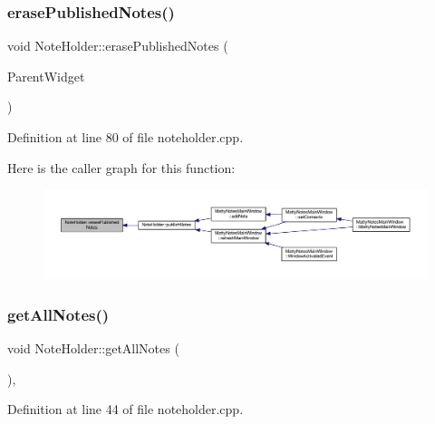 \subsubsection{\texorpdfstring{erase\+Published\+Notes()}{erasePublishedNotes()}}
{\footnotesize\ttfamily void Note\+Holder\+::erase\+Published\+Notes (\begin{DoxyParamCaption}\item[{Q\+Widget $\ast$}]{Parent\+Widget }\end{DoxyParamCaption})\hspace{0.3cm}{\ttfamily [static]}}



Definition at line 80 of file noteholder.\+cpp.

Here is the caller graph for this function\+:
\nopagebreak
\begin{figure}[H]
\begin{center}
\leavevmode
\includegraphics[width=350pt]{classNoteHolder_a4559ef4141f902ae5712052084c6187e_icgraph}
\end{center}
\end{figure}
\hypertarget{classNoteHolder_a53853f7b183e262eb165bdb3af8f3e45}{}\label{classNoteHolder_a53853f7b183e262eb165bdb3af8f3e45} 
\subsubsection{\texorpdfstring{get\+All\+Notes()}{getAllNotes()}}
{\footnotesize\ttfamily void Note\+Holder\+::get\+All\+Notes (\begin{DoxyParamCaption}{ }\end{DoxyParamCaption})\hspace{0.3cm}{\ttfamily [static]}, {\ttfamily [private]}}



Definition at line 44 of file noteholder.\+cpp.

